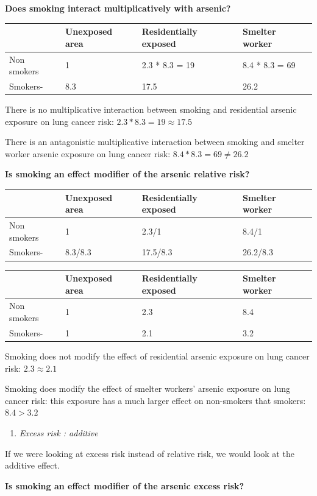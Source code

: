 \documentclass[
]{article}
\providecommand{\tightlist}{%
  \setlength{\itemsep}{0pt}\setlength{\parskip}{0pt}}
\begin{document}
\textbf{Does smoking interact multiplicatively with arsenic?}

\begin{longtable}[]{@{}llll@{}}
\toprule
& Unexposed area & Residentially exposed & Smelter worker\tabularnewline
\midrule
\endhead
Non smokers & 1 & 2.3 * 8.3 = 19 & 8.4 * 8.3 = 69\tabularnewline
Smokers- & 8.3 & 17.5 & 26.2\tabularnewline
\bottomrule
\end{longtable}

There is no multiplicative interaction between smoking and residential
arsenic exposure on lung cancer risk: \(2.3 * 8.3 = 19 \approx 17.5\)

There is an antagonistic multiplicative interaction between smoking and
smelter worker arsenic exposure on lung cancer risk:
\(8.4 * 8.3 = 69 \ne 26.2\)

\textbf{Is smoking an effect modifier of the arsenic relative risk?}

\begin{longtable}[]{@{}llll@{}}
\toprule
& Unexposed area & Residentially exposed & Smelter worker\tabularnewline
\midrule
\endhead
Non smokers & 1 & 2.3/1 & 8.4/1\tabularnewline
Smokers- & 8.3/8.3 & 17.5/8.3 & 26.2/8.3\tabularnewline
\bottomrule
\end{longtable}

\begin{longtable}[]{@{}llll@{}}
\toprule
& Unexposed area & Residentially exposed & Smelter worker\tabularnewline
\midrule
\endhead
Non smokers & 1 & 2.3 & 8.4\tabularnewline
Smokers- & 1 & 2.1 & 3.2\tabularnewline
\bottomrule
\end{longtable}

Smoking does not modify the effect of residential arsenic exposure on
lung cancer risk: \(2.3 \approx 2.1\)

Smoking does modify the effect of smelter workers' arsenic exposure on
lung cancer risk: this exposure has a much larger effect on non-smokers
that smokers: \(8.4 > 3.2\)

\begin{enumerate}
\def\labelenumi{\arabic{enumi}.}
\setcounter{enumi}{1}
\tightlist
\item
  \emph{Excess risk : additive}
\end{enumerate}

If we were looking at excess risk instead of relative risk, we would
look at the additive effect.

\textbf{Is smoking an effect modifier of the arsenic excess risk?}
\end{document}
